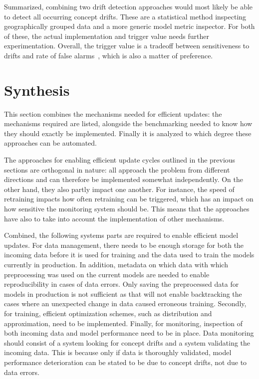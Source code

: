Summarized, combining two drift detection approaches would most likely be able to detect all occurring concept drifts. These are a statistical method inspecting geographically grouped data and a more generic model metric inspector. For both of these, the actual implementation and trigger value needs further experimentation. Overall, the trigger value is a tradeoff between sensitiveness to drifts and rate of false alarms~\cite{faithfullUnsupervisedChangeDetection2018}, which is also a matter of preference.

\section{Synthesis}

This section combines the mechanisms needed for efficient updates: the mechanisms required are listed, alongside the benchmarking needed to know how they should exactly be implemented. Finally it is analyzed to which degree these approaches can be automated.


The approaches for enabling efficient update cycles outlined in the previous sections are orthogonal in nature: all approach the problem from different directions and can therefore be implemented somewhat independently. On the other hand, they also partly impact one another. For instance, the speed of retraining impacts how often retraining can be triggered, which has an impact on how sensitive the monitoring system should be. This means that the approaches have also to take into account the implementation of other mechanisms.

Combined, the following systems parts are required to enable efficient model updates. For data management, there needs to be enough storage for both the incoming data before it is used for training and the data used to train the models currently in production. In addition, metadata on which data with which preprocessing was used on the current models are needed to enable reproducibility in cases of data errors. Only saving the preprocessed data for models in production is not sufficient as that will not enable backtracking the cases where an unexpected change in data caused erroneous training. Secondly, for training, efficient optimization schemes, such as distribution and approximation, need to be implemented. Finally, for monitoring, inspection of both incoming data and model performance need to be in place. Data monitoring should consist of a system looking for concept drifts and a system validating the incoming data. This is because only if data is thoroughly validated, model performance deterioration can be stated to be due to concept drifts, not due to data errors.

